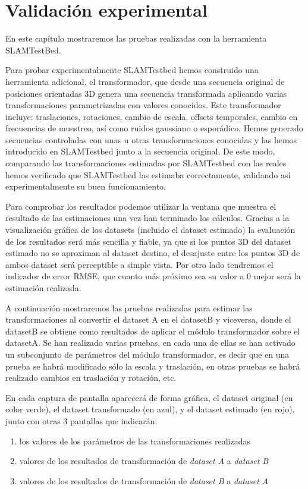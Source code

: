 \newpage
\chapter{Validación experimental} \label{cap:experimentos}
En este capítulo mostraremos las pruebas realizadas con la herramienta SLAMTestBed.

Para probar experimentalmente SLAMTestbed hemos construido una herramienta adicional, el transformador, que desde una secuencia original de posiciones orientadas 3D genera una secuencia transformada aplicando varias transformaciones parametrizadas con valores conocidos. Este transformador incluye: traslaciones, rotaciones, cambio de escala, offsets temporales, cambio en frecuencias de muestreo, así como ruidos gaussiano o esporádico.
Hemos generado secuencias controladas con unas u otras transformaciones conocidas y las hemos introducido en SLAMTestbed junto a la secuencia original. De este modo, comparando las transformaciones estimadas por SLAMTestbed con las reales hemos verificado que SLAMTestbed las estimaba correctamente, validando así experimentalmente su buen funcionamiento.

Para comprobar los resultados podemos utilizar la ventana que muestra el resultado de las estimaciones una vez han terminado los cálculos. Gracias a la visualización gráfica de los datasets (incluido el dataset estimado) la evaluación de los resultados será más sencilla y fiable, ya que si los puntos 3D del dataset estimado no se aproximan al dataset destino, el desajuste entre los puntos 3D de ambos dataset será perceptible a simple vista. 
Por otro lado tendremos el indicador de error RMSE, que cuanto más próximo sea su valor a 0 mejor será la estimación realizada.

A continuación mostraremos las pruebas realizadas para estimar las transformaciones al convertir el dataset A en el datasetB y viceversa, donde el datasetB se obtiene como resultados de aplicar el módulo transformador sobre el datasetA.
Se han realizado varias pruebas, en cada una de ellas se han activado un subconjunto de parámetros del módulo transformador, es decir que en una prueba se habrá modificado sólo la escala y traslación, en otras pruebas se habrá realizado cambios en traslación y rotación, etc.

En cada captura de pantalla aparecerá de forma gráfica, el dataset original (en color verde), el dataset transformado (en azul), y el dataset estimado (en rojo), junto con otras 3 pantallas que indicarán:
\begin{enumerate}
 \item{los valores de los parámetros de las transformaciones realizadas} 
 \item{valores de los resultados de transformación de \textit{dataset A} a \textit{dataset B}}
 \item{valores de los resultados de transformación de \textit{dataset B} a \textit{dataset A}}
\end{enumerate}

